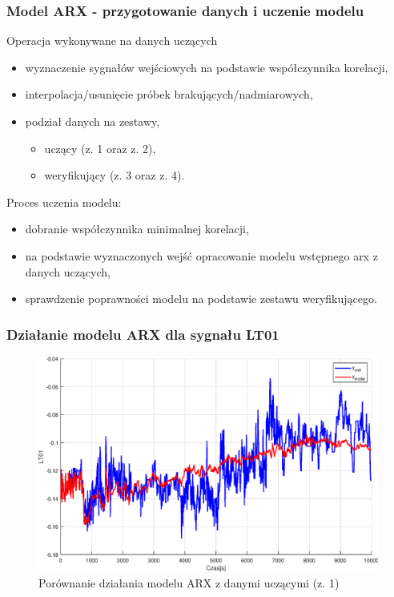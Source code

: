 \begin{frame}
  \frametitle{Model ARX - przygotowanie danych i uczenie modelu}
  \begin{block}{Operacja wykonywane na danych uczących}
    \begin{itemize}
      \item wyznaczenie sygnałów wejściowych na podstawie współczynnika korelacji,
      \item interpolacja/usunięcie próbek brakujących/nadmiarowych,
      \item podział danych na zestawy,
      \begin{itemize}
        \item uczący (z. 1 oraz z. 2),
        \item weryfikujący (z. 3 oraz z. 4).
      \end{itemize}
    \end{itemize}
  \end{block}

  \begin{block}{Proces uczenia modelu:}
    \begin{itemize}
      \item dobranie współczynnika minimalnej korelacji,
      \item na podstawie wyznaczonych wejść opracowanie modelu wstępnego arx z danych uczących,
      \item sprawdzenie poprawności modelu na podstawie zestawu weryfikującego.
    \end{itemize}
  \end{block}
\end{frame}



\begin{frame}
  \frametitle{Działanie modelu ARX dla sygnału LT01}
  \begin{figure}[H]
    \centering
    \includegraphics[width=0.75\linewidth,keepaspectratio]{results_matlab/LT01_1.eps}
    \caption{Porównanie działania modelu ARX z danymi uczącymi (z. 1)}
    \label{fig:test}
    \end{figure}
\end{frame}

